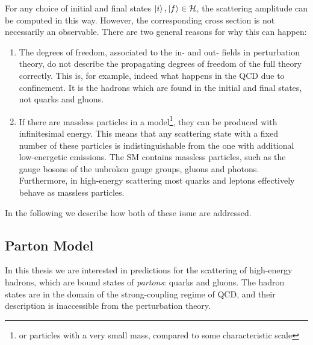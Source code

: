 For any choice of initial and final states $\ket{i},\ket{f} \in \mathcal{H}$, the scattering amplitude can be computed in this way.
However, the corresponding cross section is not necessarily an observable. 
There are two general reasons for why this can happen:
\begin{enumerate}
  \item The degrees of freedom, associated to the in- and out- fields in perturbation theory, do not describe the propagating
    degrees of freedom of the full theory correctly. This is, for example, indeed what happens in the QCD due to confinement.
    It is the hadrons which are found in the initial and final states, not quarks and gluons.

  \item If there are massless particles in a model\footnote{or particles with a very small mass, compared to some characteristic scale}, they can be produced with infinitesimal energy.
    This means that any scattering state with a fixed number of these particles is indistinguishable from the one with additional low-energetic emissions.
    The SM contains massless particles, such as the gauge bosons of the unbroken gauge groups, gluons and photons.
    Furthermore, in high-energy scattering most quarks and leptons effectively behave as massless particles.
\end{enumerate}

In the following we describe how both of these issue are addressed.

\subsection{Parton Model}
\label{sec:partonmodel}

In this thesis we are interested in predictions for the scattering of high-energy hadrons,
which are bound states of \emph{partons}: quarks and gluons.
The hadron states are in the domain of the strong-coupling regime of QCD, 
and their description is inaccessible from the perturbation theory.

